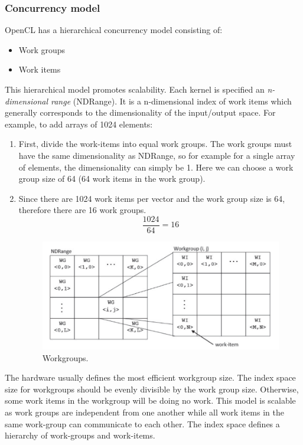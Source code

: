 \documentclass[11pt]{article}
\begin{document}
\subsubsection*{Concurrency model}
OpenCL has a hierarchical concurrency model consisting of:
\begin{itemize}
\item Work groups
\item Work items
\end{itemize}
This hierarchical model promotes scalability. Each kernel is specified an \textit{n-dimensional range} (NDRange). It is a n-dimensional index of work items which generally corresponds to the dimensionality of the input/output space. 
\n
For example, to add arrays of 1024 elements:
\begin{enumerate}
\item First, divide the work-items into equal work groups. The work groups must have the same dimensionality as NDRange, so for example for a single array of elements, the dimensionality can simply be 1. Here we can choose a work group size of 64 (64 work items in the work group). 
\item Since there are 1024 work items per vector and the work group size is 64, therefore there are 16 work groups.
\begin{equation*}
\frac{1024}{64} = 16
\end{equation*}
\begin{figure}[H]
\centering
\includegraphics[width=1\textwidth, keepaspectratio]{imgs/work-groups.png}
\caption{Workgroups.}

\end{figure}
\end{enumerate}
The hardware usually defines the most efficient workgroup size. The index space size for workgroups should be evenly divisible by the work group size. Otherwise, some work items in the workgroup will be doing no work. This model is scalable as work groups are independent from one another while all work items in the same work-group can communicate to each other. The index space defines a hierarchy of work-groups and work-items.  
\end{document}
